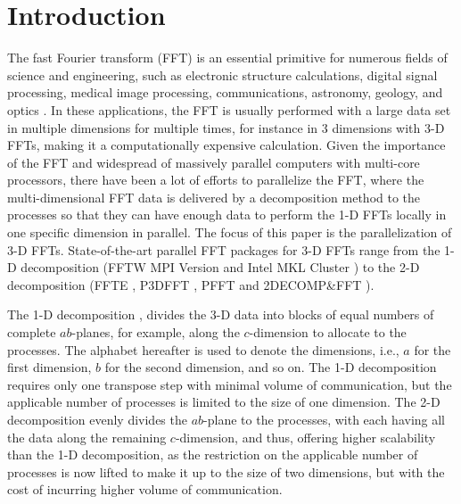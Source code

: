 \section{Introduction}
\label{Introduction}

The fast Fourier transform (FFT) \cite{citeulike:1436613} is an essential primitive for numerous fields of science and engineering, such as electronic structure calculations, digital signal processing, medical image processing, communications, astronomy, geology, and optics \cite{Haynes2000130,Clarke199214,Broughton2008,Gonzales1992}. In these applications, the FFT is usually performed with a large data set in multiple dimensions for multiple times, for instance in 3 dimensions with 3-D FFTs, making it a computationally expensive calculation. Given the importance of the FFT and widespread of massively parallel computers with multi-core processors, there have been a lot of efforts to parallelize the FFT, where the multi-dimensional FFT data is delivered by a decomposition method to the processes so that they can have enough data to perform the 1-D FFTs locally in one specific dimension in parallel. The focus of this paper is the parallelization of 3-D FFTs. State-of-the-art parallel FFT packages for 3-D FFTs range from the 1-D decomposition (FFTW MPI Version \cite{FFTW} and Intel MKL Cluster \cite{MKL}) to the 2-D decomposition (FFTE \cite{takahashi2010implementation,ffte}, P3DFFT \cite{doi:10.1137/11082748X,p3dfft}, PFFT \cite{doi:10.1137/120885887,pfft} and 2DECOMP\&FFT \cite{Li2010,2DECOMP}). 

The 1-D decomposition \cite{Haynes2000130,Dmitruk20011921}, divides the 3-D data into blocks of equal numbers of complete $ab$-planes, for example, along the $c$-dimension to allocate to the processes. The alphabet hereafter is used to denote the dimensions, i.e., $a$ for the first dimension, $b$ for the second dimension, and so on. The 1-D decomposition requires only one transpose step with minimal volume of communication, but the applicable number of processes is limited to the size of one dimension. 
The 2-D decomposition \cite{Ayala2012,takahashi2010implementation} evenly divides the $ab$-plane to the processes, with each having all the data along the remaining $c$-dimension, and thus, offering higher scalability than the 1-D decomposition, as the restriction on the applicable number of processes is now lifted to make it up to the size of two dimensions, but with the cost of incurring higher volume of communication. 





